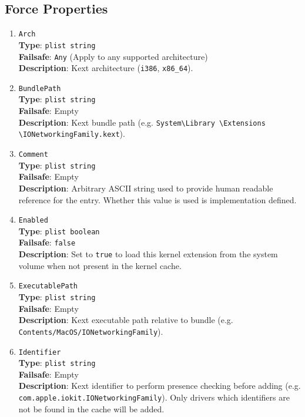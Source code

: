 \documentclass[]{article}
\makeatletter
\renewcommand{\label}[1]{%
\zref@wrapper@immediate{\oldlabel{#1}}}  %
\makeatother
\begin{document}
\subsection{Force Properties}\label{kernelpropsforce}

\begin{enumerate}
\item
  \texttt{Arch}\\
  \textbf{Type}: \texttt{plist\ string}\\
  \textbf{Failsafe}: \texttt{Any} (Apply to any supported architecture)\\
  \textbf{Description}: Kext architecture (\texttt{i386}, \texttt{x86\_64}).

\item
  \texttt{BundlePath}\\
  \textbf{Type}: \texttt{plist\ string}\\
  \textbf{Failsafe}: Empty\\
  \textbf{Description}: Kext bundle path (e.g.
  \texttt{System\textbackslash Library \textbackslash Extensions \textbackslash IONetworkingFamily.kext}).

\item
  \texttt{Comment}\\
  \textbf{Type}: \texttt{plist\ string}\\
  \textbf{Failsafe}: Empty\\
  \textbf{Description}: Arbitrary ASCII string used to provide human readable
  reference for the entry. Whether this value is used is implementation defined.

\item
  \texttt{Enabled}\\
  \textbf{Type}: \texttt{plist\ boolean}\\
  \textbf{Failsafe}: \texttt{false}\\
  \textbf{Description}: Set to \texttt{true} to load this kernel extension from the
  system volume when not present in the kernel cache.

\item
  \texttt{ExecutablePath}\\
  \textbf{Type}: \texttt{plist\ string}\\
  \textbf{Failsafe}: Empty\\
  \textbf{Description}: Kext executable path relative to bundle
  (e.g. \texttt{Contents/MacOS/IONetworkingFamily}).

\item
  \texttt{Identifier}\\
  \textbf{Type}: \texttt{plist\ string}\\
  \textbf{Failsafe}: Empty\\
  \textbf{Description}: Kext identifier to perform presence checking
  before adding (e.g. \texttt{com.apple.iokit.IONetworkingFamily}).
  Only drivers which identifiers are not be found in the cache will be added.


\end{enumerate}
\end{document}
